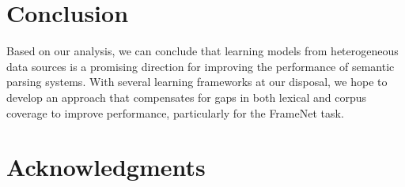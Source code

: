 \documentclass[11pt]{article}
\begin{document}

\section{Conclusion}

Based on our analysis, we can conclude that learning models from heterogeneous data sources 
is a promising direction for improving the performance of semantic parsing systems.
With several learning frameworks at our disposal, we hope to develop an approach 
that compensates for gaps in both lexical and corpus coverage to improve performance, particularly for the FrameNet task.
\section*{Acknowledgments}


{\fontsize{10}{12.25}\selectfont
}
\end{document}
